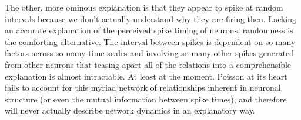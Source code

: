 \documentclass[12pt]{article}
\begin{document}
The other, more ominous explanation is that they appear to spike at random intervals because we don't actually understand why they are firing then.  Lacking an accurate explanation of the perceived spike timing of neurons, randomness is the comforting alternative.  The interval between spikes is dependent on so many factors across so many time scales and involving so many other spikes generated from other neurons that teasing apart all of the relations into a comprehensible explanation is almost intractable.  At least at the moment.  Poisson at its heart fails to account for this myriad network of relationships inherent in neuronal structure (or even the mutual information between spike times), and therefore will never actually describe network dynamics in an explanatory way.  
\end{document}
